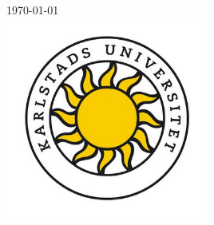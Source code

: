 \begin{titlepage}
\begin{minipage}{0.4\textwidth}
\begin{flushright}
  \end{flushright}
  \end{minipage}\\[1.5cm]



  {\large \today}\\[1.5cm] %


  \includegraphics[width=0.5\textwidth]{bilder/kau.jpg}\\[1cm] %
   

   \vfill %

   \end{titlepage}

